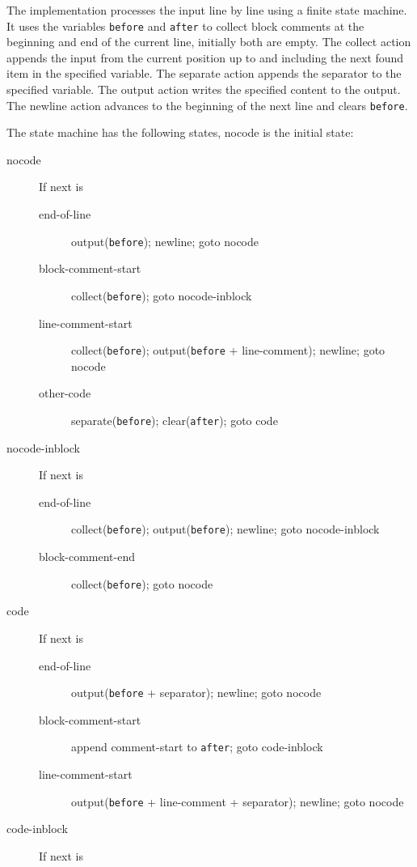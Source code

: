 \documentclass[a4paper]{report}
\newcommand{\code}[1]{\textnormal{\texttt{#1}}}
\begin{document}
The implementation processes the input line by line using a finite state machine. It uses the variables \code{before} and 
\code{after} to collect block comments at the beginning and end of the current line, initially both are empty. 
The collect action appends the input from the current position up to and including the next found item in 
the specified variable. The separate action appends the separator to the specified variable. The output action 
writes the specified content to the output. The newline
action advances to the beginning of the next line and clears \code{before}.

The state machine has the following states, nocode is the initial state:

\begin{description}
\item[nocode] If next is
  \begin{description}
  \item[end-of-line] output(\code{before}); newline; goto nocode
  \item[block-comment-start] collect(\code{before}); goto nocode-inblock
  \item[line-comment-start] collect(\code{before}); output(\code{before} + line-comment); newline; goto nocode
  \item[other-code] separate(\code{before}); clear(\code{after}); goto code
  \end{description}
\item[nocode-inblock] If next is
  \begin{description}
  \item[end-of-line] collect(\code{before}); output(\code{before}); newline; goto nocode-inblock
  \item[block-comment-end] collect(\code{before}); goto nocode
  \end{description}
\item[code] If next is
  \begin{description}
  \item[end-of-line] output(\code{before} + separator); newline; goto nocode
  \item[block-comment-start] append comment-start to \code{after}; goto code-inblock
  \item[line-comment-start] output(\code{before} + line-comment + separator); newline; goto nocode
  \end{description}
\item[code-inblock] If next is
  \begin{description}

\end{description}
\end{description}
\end{document}
